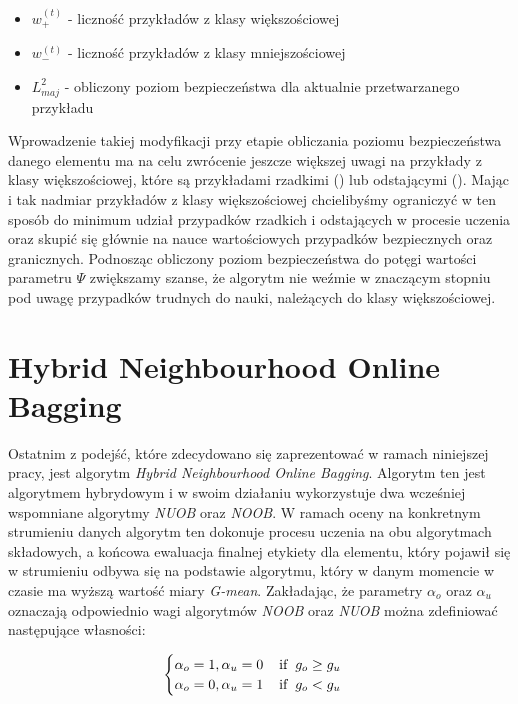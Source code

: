 \begin{itemize}
    \item $w^{(t)}_{+}$ - liczność przykładów z klasy większościowej
    \item $w^{(t)}_{-}$ - liczność przykładów z klasy mniejszościowej
    \item $L^2_{maj}$ - obliczony poziom bezpieczeństwa dla aktualnie przetwarzanego przykładu
\end{itemize}

\noindent Wprowadzenie takiej modyfikacji przy etapie obliczania poziomu bezpieczeństwa danego elementu ma na celu zwrócenie jeszcze większej uwagi na przykłady z klasy większościowej, które są przykładami rzadkimi () lub odstającymi (). Mając i tak nadmiar przykładów z klasy większościowej chcielibyśmy ograniczyć w ten sposób do minimum udział przypadków rzadkich i odstających w procesie uczenia oraz skupić się głównie na nauce wartościowych przypadków bezpiecznych oraz granicznych. Podnosząc obliczony poziom bezpieczeństwa do potęgi wartości parametru $\Psi$ zwiększamy szanse, że algorytm nie weźmie w znaczącym stopniu pod uwagę przypadków trudnych do nauki, należących do klasy większościowej.

\newpage

\section{Hybrid Neighbourhood Online Bagging}

\noindent Ostatnim z podejść, które zdecydowano się zaprezentować w ramach niniejszej pracy, jest algorytm \textit{Hybrid Neighbourhood Online Bagging}. Algorytm ten jest algorytmem hybrydowym i w swoim działaniu wykorzystuje dwa wcześniej wspomniane algorytmy \textit{NUOB} oraz \textit{NOOB}. W ramach oceny na konkretnym strumieniu danych algorytm ten dokonuje procesu uczenia na obu algorytmach składowych, a końcowa ewaluacja finalnej etykiety dla elementu, który pojawił się w strumieniu odbywa się na podstawie algorytmu, który w danym momencie w czasie ma wyższą wartość miary \textit{G-mean}. Zakładając, że parametry $\alpha_o$ oraz $\alpha_u$ oznaczają odpowiednio wagi algorytmów \textit{NOOB} oraz \textit{NUOB} można zdefiniować następujące własności:

\begin{equation}
    \begin{cases}
    \alpha_o = 1, \alpha_u = 0 \hspace{4mm} \textrm{if} \hspace{2mm} g_o \geq g_u\\
    \alpha_o = 0, \alpha_u = 1 \hspace{4mm} \textrm{if} \hspace{2mm} g_o < g_u
    \end{cases}
\end{equation}

